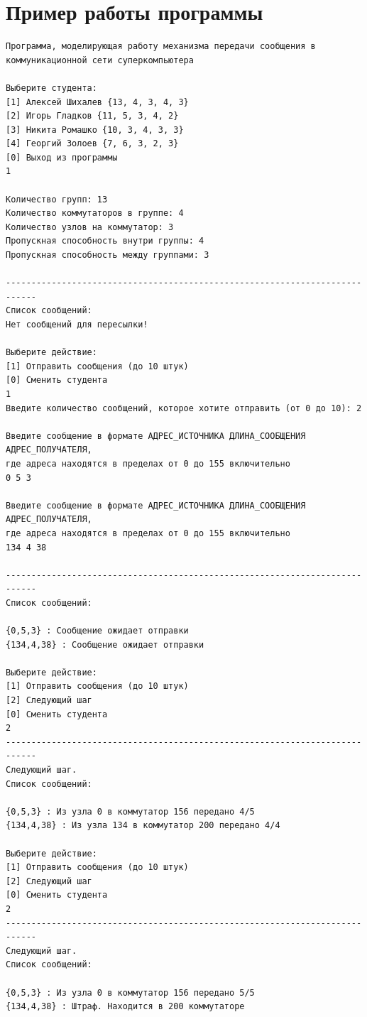 \documentclass[11pt,a4paper,final]{article} %
\begin{document}
\newpage
\section{Пример работы программы}

\begin{lstlisting}[label=lst6]
Программа, моделирующая работу механизма передачи сообщения в коммуникационной сети суперкомпьютера

Выберите студента:
[1] Алексей Шихалев {13, 4, 3, 4, 3}
[2] Игорь Гладков {11, 5, 3, 4, 2}
[3] Никита Ромашко {10, 3, 4, 3, 3}
[4] Георгий Золоев {7, 6, 3, 2, 3}
[0] Выход из программы
1

Количество групп: 13
Количество коммутаторов в группе: 4
Количество узлов на коммутатор: 3
Пропускная способность внутри группы: 4
Пропускная способность между группами: 3

----------------------------------------------------------------------------
Список сообщений:
Нет сообщений для пересылки!

Выберите действие:
[1] Отправить сообщения (до 10 штук)
[0] Сменить студента
1
Введите количество сообщений, которое хотите отправить (от 0 до 10): 2

Введите сообщение в формате АДРЕС_ИСТОЧНИКА ДЛИНА_СООБЩЕНИЯ АДРЕС_ПОЛУЧАТЕЛЯ,
где адреса находятся в пределах от 0 до 155 включительно
0 5 3

Введите сообщение в формате АДРЕС_ИСТОЧНИКА ДЛИНА_СООБЩЕНИЯ АДРЕС_ПОЛУЧАТЕЛЯ,
где адреса находятся в пределах от 0 до 155 включительно
134 4 38

----------------------------------------------------------------------------
Список сообщений:

{0,5,3} : Сообщение ожидает отправки
{134,4,38} : Сообщение ожидает отправки

Выберите действие:
[1] Отправить сообщения (до 10 штук)
[2] Следующий шаг
[0] Сменить студента
2
----------------------------------------------------------------------------
Следующий шаг.
Список сообщений:

{0,5,3} : Из узла 0 в коммутатор 156 передано 4/5
{134,4,38} : Из узла 134 в коммутатор 200 передано 4/4

Выберите действие:
[1] Отправить сообщения (до 10 штук)
[2] Следующий шаг
[0] Сменить студента
2
----------------------------------------------------------------------------
Следующий шаг.
Список сообщений:

{0,5,3} : Из узла 0 в коммутатор 156 передано 5/5
{134,4,38} : Штраф. Находится в 200 коммутаторе


\end{lstlisting}
\end{document}
